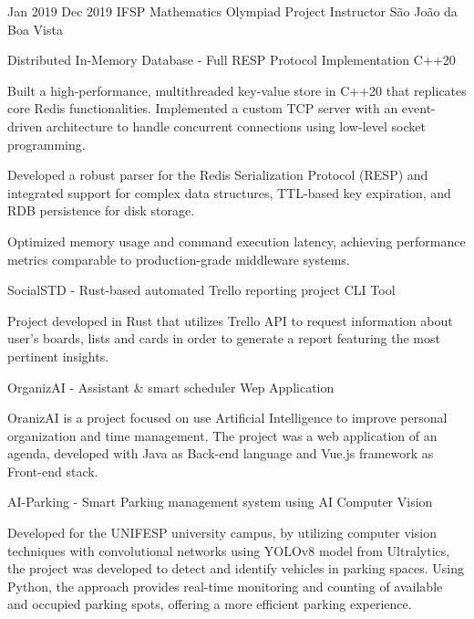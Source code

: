 {Jan 2019}
{Dec 2019}
{IFSP}
{Mathematics Olympiad Project Instructor}
{São João da Boa Vista}
{
\jbegin
\jend
}

{Distributed In-Memory Database - Full RESP Protocol Implementation \textbar{} C++20}
{
\jbegin
    \item{
            Built a high-performance, multithreaded key-value store in C++20 that replicates core Redis functionalities. 
            Implemented a custom TCP server with an event-driven architecture to handle concurrent connections 
            using low-level socket programming.
         }
    \item{
            Developed a robust parser for the Redis Serialization Protocol (RESP) and integrated support for 
            complex data structures, TTL-based key expiration, and RDB persistence for disk storage.
         }
    \item{
            Optimized memory usage and command execution latency, achieving performance metrics comparable 
            to production-grade middleware systems.
         }
\jend
}
{SocialSTD - Rust-based automated Trello reporting project \textbar{} CLI Tool}
{
\jbegin
    \item{
            Project developed in Rust that utilizes Trello API to request information about 
            user's boards, lists and cards in order to generate a report featuring the most pertinent insights.
         }
\jend
}

{OrganizAI - Assistant \& smart scheduler \textbar{} Wep Application}
{
\jbegin
    \item{
            OranizAI is a project focused on use Artificial Intelligence to improve personal
            organization and time management. The project was a web application of an agenda, developed with Java
            as Back-end language and Vue.js framework as Front-end stack.
         }
\jend
}

{AI-Parking - Smart Parking management system using AI \textbar{} Computer Vision}
{
\jbegin
    \item{
            Developed for the UNIFESP university campus, by utilizing computer vision techniques with convolutional
            networks using YOLOv8 model from Ultralytics, the project was developed to detect and identify
            vehicles in parking spaces. Using Python, the approach provides real-time
            monitoring and counting of available and occupied parking spots, offering a more efficient parking experience.
         }
\jend
}

